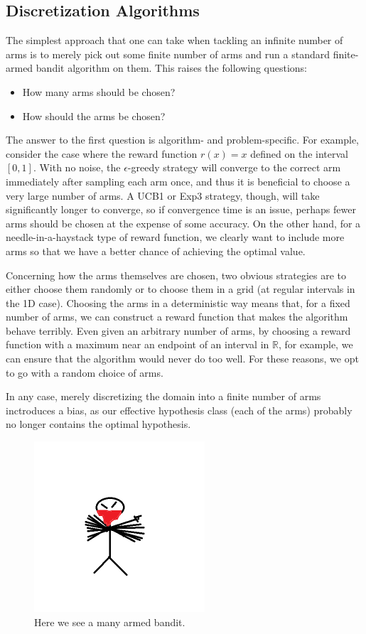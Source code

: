 \documentclass{article}
\begin{document}
\subsection{Discretization Algorithms}
The simplest approach that one can take when tackling an infinite number of
arms is to merely pick out some finite number of arms and run a standard
finite-armed bandit algorithm on them.  This raises the following 
questions:
\begin{itemize}
\item How many arms should be chosen?
\item How should the arms be chosen?
\end{itemize}
The answer to the first question is algorithm- and problem-specific.  For
example, consider the case where the reward function $r(x) = x$ defined
on the interval $[0,1]$.  With no noise, the $\epsilon$-greedy strategy
will converge to the correct arm immediately after sampling each arm once,
and thus it is beneficial to choose a very large number of arms.  A
UCB1 or Exp3 strategy, though, will take significantly longer to
converge, so if convergence time is an issue, perhaps fewer arms should be
chosen at the expense of some accuracy.  On the other hand, for a
needle-in-a-haystack type of reward function, we clearly want to
include more arms so that we have a better chance of achieving the
optimal value.

Concerning how the arms themselves are chosen, two obvious strategies are
to either choose them randomly or to choose them in a grid (at regular
intervals in the 1D case).  Choosing the arms in a deterministic way
means that, for a fixed number of arms, we can construct a reward function
that makes the algorithm behave terribly.  Even given an arbitrary number
of arms, by choosing a reward function with a maximum near an endpoint of
an interval in $\mathbb{R}$, for example, we can ensure that the algorithm
would never do too well.  For these reasons, we opt to go with a random
choice of arms.

In any case, merely discretizing the domain into a finite number of arms
inctroduces a bias, as our effective hypothesis class (each of the arms)
probably no longer contains the optimal hypothesis.


\begin{figure}
 \centering
 \includegraphics[width=240px]{./image.png}
 \caption{Here we see a many armed bandit.}
 \label{manyarms}
\end{figure}
\end{document}
